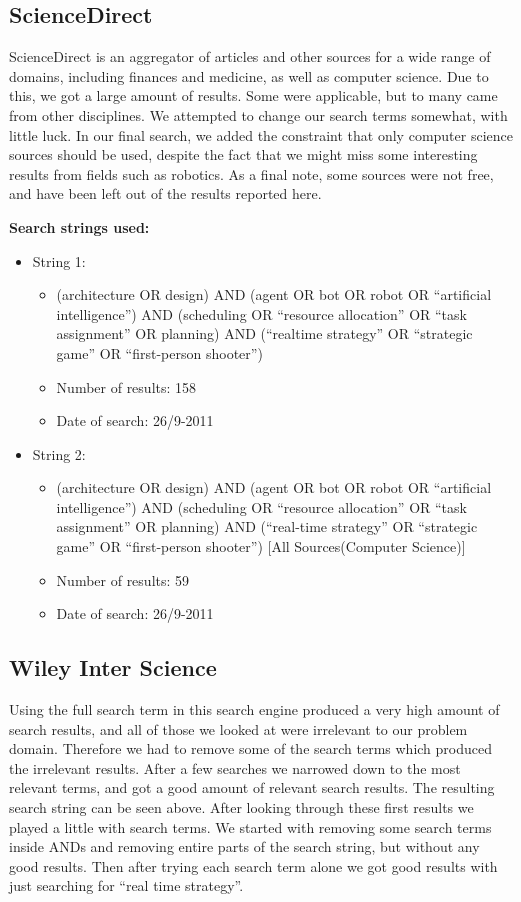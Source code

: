 \subsection{ScienceDirect}
\label{sub:sciencedirect}
ScienceDirect is an aggregator of articles and other sources for a wide range of domains, including finances and medicine, as well as computer science.  Due to this, we got a large amount of results.  Some were applicable, but to many came from other disciplines.  We attempted to change our search terms somewhat, with little luck.  In our final search, we added the constraint that only computer science sources should be used, despite the fact that we might miss some interesting results from fields such as robotics.  As a final note, some sources were not free, and have been left out of the results reported here.

\textbf{Search strings used:}
\begin{itemize}
\item String 1:
\begin{itemize}
\item (architecture OR design) AND (agent OR bot OR robot OR ``artificial intelligence'') AND (scheduling OR ``resource allocation'' OR ``task assignment'' OR planning)  AND (``realtime strategy'' OR ``strategic game'' OR ``first-person shooter'')
\item Number of results: 158
\item Date of search: 26/9-2011
\end{itemize}
\item String 2:
\begin{itemize}
\item (architecture OR design) AND (agent OR bot OR robot OR ``artificial intelligence'') AND (scheduling OR ``resource allocation'' OR ``task assignment'' OR planning) AND (``real-time strategy'' OR ``strategic game'' OR ``first-person shooter'') [All Sources(Computer Science)]
\item Number of results: 59
\item Date of search: 26/9-2011
\end{itemize}
\end{itemize}

\subsection{Wiley Inter Science}
\label{sub:wiley_inter_science}
Using the full search term in this search engine produced a very high amount of search results, and all of those we looked at were irrelevant to our problem domain. Therefore we had to remove some of the search terms which produced the irrelevant results. After a few searches we narrowed down to the most relevant terms, and got a good amount of relevant search results. The resulting search string can be seen above. After looking through these first results we played a little with search terms. We started with removing some search terms inside ANDs and removing entire parts of the search string, but without any good results. Then after trying each search term alone we got good results with just searching for ``real time strategy''.

